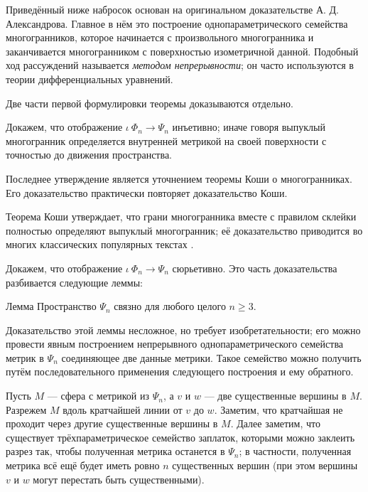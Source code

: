 \documentclass[oneside,a4paper]{article}
\begin{document}
Приведённый ниже набросок основан на оригинальном доказательстве А. Д. Александрова.
Главное в нём это построение однопараметрического семейства многогранников, которое начинается с произвольного многогранника и заканчивается многогранником с поверхностью изометричной данной.  
Подобный ход рассуждений называется \emph{методом непрерывности};
он часто используются в теории дифференциальных уравнений.

\medskip

Две части первой формулировки теоремы доказываются отдельно.

 Докажем, что отображение $\iota\:\Phi_n\to\Psi_n$ инъетивно; иначе говоря выпуклый многогранник определяется внутренней метрикой на своей поверхности с точностью до движения пространства.

Последнее утверждение является уточнением теоремы Коши о многогранниках. 
Его доказательство практически повторяет доказательство Коши.

Теорема Коши утверждает, что грани многогранника вместе с правилом склейки полностью определяют выпуклый многогранник;
её доказательство приводится во многих классических популярных текстах \cite{aigner-zigler,dolbilin,tabacnikov-fuks}.

\medskip

 Докажем, что отображение $\iota\:\Phi_n\to\Psi_n$ сюрьетивно.
Это часть доказательства разбивается следующие леммы:

\begin{thm}{Лемма}
Пространство $\Psi_n$ связно для любого целого $n\ge 3$.
\end{thm}

Доказательство этой леммы несложное, но требует изобретательности; 
его можно провести явным построением непрерывного однопараметрического семейства  метрик в $\Psi_n$ соединяющее две данные метрики.
Такое семейство можно получить путём последовательного применения следующего построения и ему обратного.

Пусть $M$ --- сфера с метрикой из $\Psi_n$, а $v$ и $w$ --- две существенные вершины в $M$.
Разрежем $M$ вдоль кратчайшей линии от $v$ до $w$. 
Заметим, что кратчайшая не проходит через другие существенные вершины в $M$.
Далее заметим, что существует трёхпараметрическое семейство заплаток, которыми можно заклеить разрез так, чтобы полученная метрика останется в $\Psi_n$; 
в частности, полученная метрика всё ещё будет иметь ровно $n$ существенных вершин (при этом вершины $v$ и $w$ могут перестать быть существенными).
\end{document}
